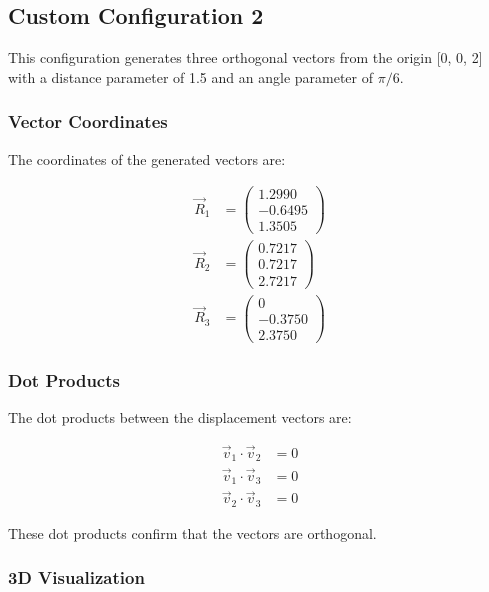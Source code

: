 \subsection{Custom Configuration 2}

This configuration generates three orthogonal vectors from the origin [0, 0, 2] with a distance parameter of 1.5 and an angle parameter of $\pi/6$.

\subsubsection{Vector Coordinates}

The coordinates of the generated vectors are:

\begin{align}
\vec{R}_1 &= \begin{pmatrix} 1.2990 \\ -0.6495 \\ 1.3505 \end{pmatrix} \\
\vec{R}_2 &= \begin{pmatrix} 0.7217 \\ 0.7217 \\ 2.7217 \end{pmatrix} \\
\vec{R}_3 &= \begin{pmatrix} 0 \\ -0.3750 \\ 2.3750 \end{pmatrix}
\end{align}

\subsubsection{Dot Products}

The dot products between the displacement vectors are:

\begin{align}
\vec{v}_1 \cdot \vec{v}_2 &= 0 \\
\vec{v}_1 \cdot \vec{v}_3 &= 0 \\
\vec{v}_2 \cdot \vec{v}_3 &= 0
\end{align}

These dot products confirm that the vectors are orthogonal.

\subsubsection{3D Visualization}


